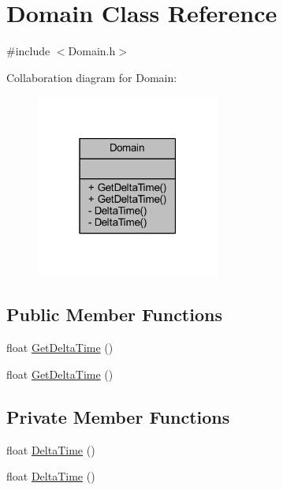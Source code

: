 \hypertarget{class_domain}{}\section{Domain Class Reference}
\label{class_domain}


{\ttfamily \#include $<$Domain.\+h$>$}



Collaboration diagram for Domain\+:\nopagebreak
\begin{figure}[H]
\begin{center}
\leavevmode
\includegraphics[width=171pt]{class_domain__coll__graph}
\end{center}
\end{figure}
\subsection*{Public Member Functions}
\begin{DoxyCompactItemize}
\item 
float \mbox{\hyperlink{class_domain_a595099f01805b1c9975a4d20be49e995}{Get\+Delta\+Time}} ()
\item 
float \mbox{\hyperlink{class_domain_a595099f01805b1c9975a4d20be49e995}{Get\+Delta\+Time}} ()
\end{DoxyCompactItemize}
\subsection*{Private Member Functions}
\begin{DoxyCompactItemize}
\item 
float \mbox{\hyperlink{class_domain_aba45357664ea3ca0566e079f229ad6a2}{Delta\+Time}} ()
\item 
float \mbox{\hyperlink{class_domain_aba45357664ea3ca0566e079f229ad6a2}{Delta\+Time}} ()
\end{DoxyCompactItemize}


